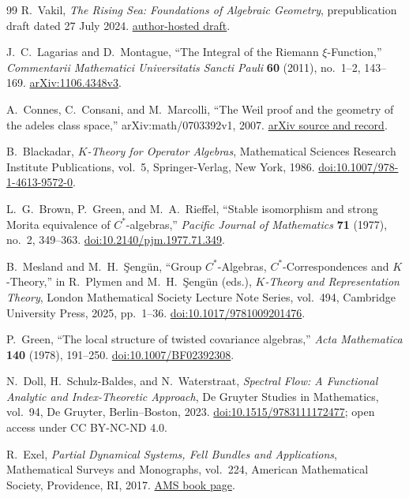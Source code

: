 \begin{thebibliography}{99}
R.~Vakil,
\emph{The Rising Sea: Foundations of Algebraic Geometry},
prepublication draft dated 27 July 2024.
\href{https://math.stanford.edu/~vakil/216blog/FOAGjul2724public.pdf}{author-hosted draft}.

J.~C.~Lagarias and D.~Montague,
``The Integral of the Riemann $\xi$-Function,''
\emph{Commentarii Mathematici Universitatis Sancti Pauli} \textbf{60} (2011),
no.~1--2, 143--169.
\href{https://arxiv.org/abs/1106.4348}{arXiv:1106.4348v3}.

A.~Connes, C.~Consani, and M.~Marcolli,
``The Weil proof and the geometry of the adeles class space,''
arXiv:math/0703392v1, 2007.
\href{https://arxiv.org/abs/math/0703392}{arXiv source and record}.

B.~Blackadar,
\emph{$K$-Theory for Operator Algebras},
Mathematical Sciences Research Institute Publications, vol.~5,
Springer-Verlag, New York, 1986.
\href{https://doi.org/10.1007/978-1-4613-9572-0}{doi:10.1007/978-1-4613-9572-0}.

L.~G.~Brown, P.~Green, and M.~A.~Rieffel,
``Stable isomorphism and strong Morita equivalence of $C^*$-algebras,''
\emph{Pacific Journal of Mathematics} \textbf{71} (1977), no.~2, 349--363.
\href{https://doi.org/10.2140/pjm.1977.71.349}{doi:10.2140/pjm.1977.71.349}.

B.~Mesland and M.~H.~\c{S}eng\"un,
``Group $C^*$-Algebras, $C^*$-Correspondences and $K$-Theory,''
in R.~Plymen and M.~H.~\c{S}eng\"un (eds.),
\emph{$K$-Theory and Representation Theory},
London Mathematical Society Lecture Note Series, vol.~494,
Cambridge University Press, 2025, pp.~1--36.
\href{https://doi.org/10.1017/9781009201476}{doi:10.1017/9781009201476}.

P.~Green,
``The local structure of twisted covariance algebras,''
\emph{Acta Mathematica} \textbf{140} (1978), 191--250.
\href{https://doi.org/10.1007/BF02392308}{doi:10.1007/BF02392308}.

N.~Doll, H.~Schulz-Baldes, and N.~Waterstraat,
\emph{Spectral Flow: A Functional Analytic and Index-Theoretic Approach},
De Gruyter Studies in Mathematics, vol.~94,
De Gruyter, Berlin--Boston, 2023.
\href{https://doi.org/10.1515/9783111172477}
{doi:10.1515/9783111172477}; open access under CC BY-NC-ND 4.0.

R.~Exel,
\emph{Partial Dynamical Systems, Fell Bundles and Applications},
Mathematical Surveys and Monographs, vol.~224,
American Mathematical Society, Providence, RI, 2017.
\href{https://www.ams.org/bookpages/surv-224}{AMS book page}.


\end{thebibliography}

